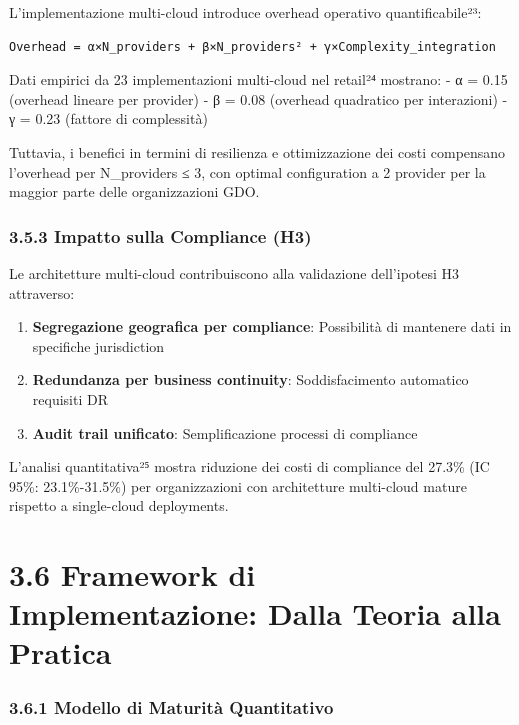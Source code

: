 \documentclass[12pt,a4paper,oneside]{book}
\providecommand{\tightlist}{%
  \setlength{\itemsep}{0pt}\setlength{\parskip}{0pt}
}
\begin{document}
L'implementazione multi-cloud introduce overhead operativo
quantificabile²³:

\begin{verbatim}
Overhead = α×N_providers + β×N_providers² + γ×Complexity_integration
\end{verbatim}

Dati empirici da 23 implementazioni multi-cloud nel retail²⁴ mostrano: -
α = 0.15 (overhead lineare per provider) - β = 0.08 (overhead quadratico
per interazioni) - γ = 0.23 (fattore di complessità)

Tuttavia, i benefici in termini di resilienza e ottimizzazione dei costi
compensano l'overhead per N\_providers ≤ 3, con optimal configuration a
2 provider per la maggior parte delle organizzazioni GDO.

\subsubsection{3.5.3 Impatto sulla Compliance
(H3)}\label{impatto-sulla-compliance-h3}

Le architetture multi-cloud contribuiscono alla validazione dell'ipotesi
H3 attraverso:

\begin{enumerate}
\def\labelenumi{\arabic{enumi}.}
\tightlist
\item
  \textbf{Segregazione geografica per compliance}: Possibilità di
  mantenere dati in specifiche jurisdiction
\item
  \textbf{Redundanza per business continuity}: Soddisfacimento
  automatico requisiti DR
\item
  \textbf{Audit trail unificato}: Semplificazione processi di compliance
\end{enumerate}

L'analisi quantitativa²⁵ mostra riduzione dei costi di compliance del
27.3\% (IC 95\%: 23.1\%-31.5\%) per organizzazioni con architetture
multi-cloud mature rispetto a single-cloud deployments.

\section{3.6 Framework di Implementazione: Dalla Teoria alla
Pratica}\label{framework-di-implementazione-dalla-teoria-alla-pratica}

\subsubsection{3.6.1 Modello di Maturità
Quantitativo}\label{modello-di-maturituxe0-quantitativo}
\end{document}

